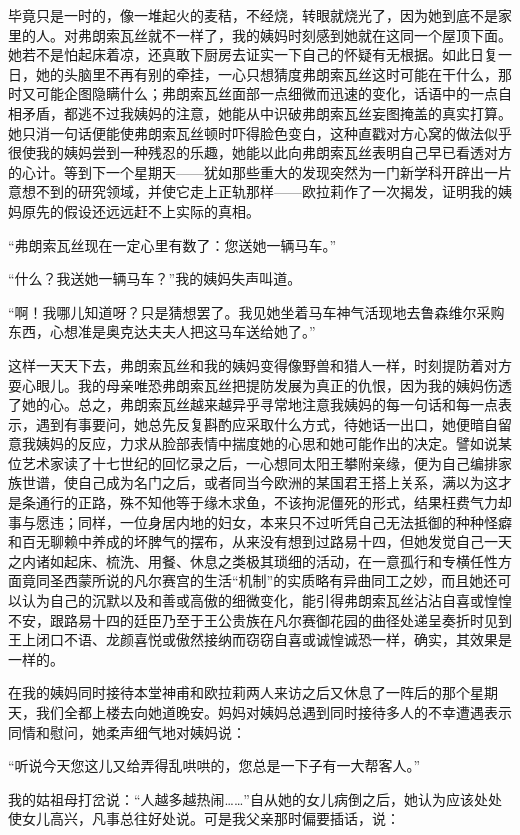 毕竟只是一时的，像一堆起火的麦秸，不经烧，转眼就烧光了，因为她到底不是家里的人。对弗朗索瓦丝就不一样了，我的姨妈时刻感到她就在这同一个屋顶下面。她若不是怕起床着凉，还真敢下厨房去证实一下自己的怀疑有无根据。如此日复一日，她的头脑里不再有别的牵挂，一心只想猜度弗朗索瓦丝这时可能在干什么，那时又可能企图隐瞒什么；弗朗索瓦丝面部一点细微而迅速的变化，话语中的一点自相矛盾，都逃不过我姨妈的注意，她能从中识破弗朗索瓦丝妄图掩盖的真实打算。她只消一句话便能使弗朗索瓦丝顿时吓得脸色变白，这种直戳对方心窝的做法似乎很使我的姨妈尝到一种残忍的乐趣，她能以此向弗朗索瓦丝表明自己早已看透对方的心计。等到下一个星期天——犹如那些重大的发现突然为一门新学科开辟出一片意想不到的研究领域，并使它走上正轨那样——欧拉莉作了一次揭发，证明我的姨妈原先的假设还远远赶不上实际的真相。
\par “弗朗索瓦丝现在一定心里有数了：您送她一辆马车。”
\par “什么？我送她一辆马车？”我的姨妈失声叫道。
\par “啊！我哪儿知道呀？只是猜想罢了。我见她坐着马车神气活现地去鲁森维尔采购东西，心想准是奥克达夫夫人把这马车送给她了。”
\par 这样一天天下去，弗朗索瓦丝和我的姨妈变得像野兽和猎人一样，时刻提防着对方耍心眼儿。我的母亲唯恐弗朗索瓦丝把提防发展为真正的仇恨，因为我的姨妈伤透了她的心。总之，弗朗索瓦丝越来越异乎寻常地注意我姨妈的每一句话和每一点表示，遇到有事要问，她总先反复斟酌应采取什么方式，待她话一出口，她便暗自留意我姨妈的反应，力求从脸部表情中揣度她的心思和她可能作出的决定。譬如说某位艺术家读了十七世纪的回忆录之后，一心想同太阳王攀附亲缘，便为自己编排家族世谱，使自己成为名门之后，或者同当今欧洲的某国君王搭上关系，满以为这才是条通行的正路，殊不知他等于缘木求鱼，不该拘泥僵死的形式，结果枉费气力却事与愿违；同样，一位身居内地的妇女，本来只不过听凭自己无法抵御的种种怪癖和百无聊赖中养成的坏脾气的摆布，从来没有想到过路易十四，但她发觉自己一天之内诸如起床、梳洗、用餐、休息之类极其琐细的活动，在一意孤行和专横任性方面竟同圣西蒙所说的凡尔赛宫的生活“机制”的实质略有异曲同工之妙，而且她还可以认为自己的沉默以及和善或高傲的细微变化，能引得弗朗索瓦丝沾沾自喜或惶惶不安，跟路易十四的廷臣乃至于王公贵族在凡尔赛御花园的曲径处递呈奏折时见到王上闭口不语、龙颜喜悦或傲然接纳而窃窃自喜或诚惶诚恐一样，确实，其效果是一样的。
\par 在我的姨妈同时接待本堂神甫和欧拉莉两人来访之后又休息了一阵后的那个星期天，我们全都上楼去向她道晚安。妈妈对姨妈总遇到同时接待多人的不幸遭遇表示同情和慰问，她柔声细气地对姨妈说：
\par “听说今天您这儿又给弄得乱哄哄的，您总是一下子有一大帮客人。”
\par 我的姑祖母打岔说：“人越多越热闹……”自从她的女儿病倒之后，她认为应该处处使女儿高兴，凡事总往好处说。可是我父亲那时偏要插话，说：
